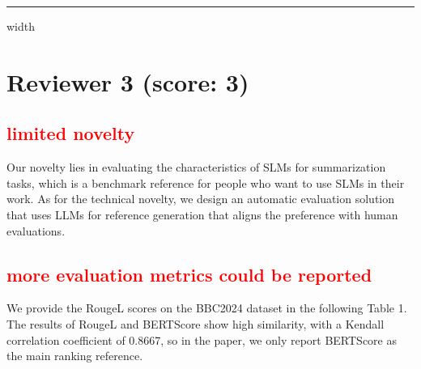 \documentclass[a4paper]{article}
\begin{document}
\hrule height 0.5mm width \textwidth


\section{Reviewer 3 (score: 3)}

\subsection{\textcolor{red}{ limited novelty}}

Our novelty lies in evaluating the characteristics of SLMs for summarization tasks, which is a benchmark reference for people who want to use SLMs in their work. As for the technical novelty, we design an automatic evaluation solution that uses LLMs for reference generation that aligns the preference with human evaluations.

\subsection{\textcolor{red}{more evaluation metrics could be reported}}

We provide the RougeL scores on the BBC2024 dataset in the following Table 1. The results of RougeL and BERTScore show high similarity, with a Kendall correlation coefficient of 0.8667, so in the paper, we only report BERTScore as the main ranking reference.
\end{document}
